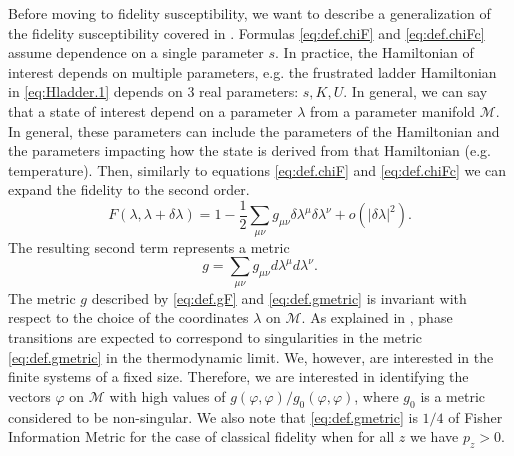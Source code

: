 \documentclass[
  american,aps,pra,reprint,floatfix,nofootinbib,superscriptaddress
]{revtex4-2}
\newcommand{\abs}[1]{\left|#1\right|}
\begin{document}
Before moving to fidelity susceptibility, we want to describe a generalization
of the fidelity susceptibility covered in \cite{zanardi2007information}.
Formulas \eqref{eq:def.chiF} and \eqref{eq:def.chiFc} assume dependence
on a single parameter $s$. In practice, the Hamiltonian of interest depends
on multiple parameters, e.g. the frustrated ladder Hamiltonian in
\eqref{eq:Hladder.1} depends on 3 real parameters: $s, K, U$. In general,
we can say that a state of interest depend on a parameter $\lambda$ from
a parameter manifold $\mathcal{M}$. In general, these parameters
can include the parameters of the Hamiltonian and the parameters impacting
how the state is derived from that Hamiltonian (e.g. temperature).
Then, similarly to equations
\eqref{eq:def.chiF} and \eqref{eq:def.chiFc} we can expand the fidelity
to the second order.
\begin{equation}
\label{eq:def.gF}
  F(\lambda, \lambda + \delta \lambda) =
  1 - \frac12 \sum_{\mu\nu} g_{\mu\nu} \delta \lambda^\mu \delta \lambda^\nu
  + o(\abs{\delta \lambda}^2).
\end{equation}
The resulting second term represents a metric
\begin{equation}
  \label{eq:def.gmetric}
  g = \sum_{\mu\nu} g_{\mu\nu} d\lambda^\mu d\lambda^\nu.
\end{equation}
The metric $g$ described by \eqref{eq:def.gF} and \eqref{eq:def.gmetric}
is invariant with
respect to the choice of the coordinates $\lambda$ on $\mathcal{M}$.
As explained in \cite{zanardi2007information}, phase transitions are expected
to correspond to singularities in the metric \eqref{eq:def.gmetric} in the
thermodynamic limit. We, however, are interested in the finite systems
of a fixed size. Therefore, we are interested in identifying the vectors
$\varphi$ on $\mathcal{M}$ with high values of
$g(\varphi, \varphi) / g_0(\varphi, \varphi)$,
where $g_0$ is a metric considered to be non-singular.
We also note that \eqref{eq:def.gmetric} is $1/4$ of Fisher Information Metric
for the case of classical fidelity when for all $z$ we have $p_z > 0$.
\end{document}
